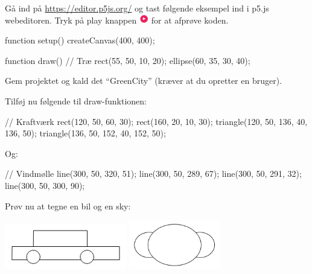 \documentclass{ucph-handout}
\newcounter{handout}
\newcommand{\Ark}{Ark \#\arabic{handout} -- }
\begin{document}
\renewcommand{\Title}{\Ark Tegn med Processing.py}%
\begin{exercisebox}[adjusted title=Første program]
Gå ind på \url{https://editor.p5js.org/} og tast følgende eksempel ind
i p5.js webeditoren. Tryk på play knappen
\includegraphics[height=4mm]{../illustrations/images/play_p5js} for at afprøve
koden.

\begin{javascript} 
function setup() {
  createCanvas(400, 400);
}

function draw() {
  // Træ
  rect(55, 50, 10, 20);
  ellipse(60, 35, 30, 40);
}
\end{javascript}

\vspace{3mm}
\noindent
Gem projektet og kald det ``GreenCity'' (kræver at du opretter en bruger).

\vspace{3mm}
\noindent
Tilføj nu følgende til draw-funktionen:
\begin{javascript}
// Kraftværk
rect(120, 50, 60, 30);
rect(160, 20, 10, 30);
triangle(120, 50, 136, 40, 136, 50);
triangle(136, 50, 152, 40, 152, 50);
\end{javascript}
Og:
\begin{javascript}
// Vindmølle
line(300, 50, 320, 51);
line(300, 50, 289, 67);
line(300, 50, 291, 32);
line(300, 50, 300, 90);
\end{javascript}

Prøv nu at tegne en bil og en sky:

\includegraphics[width=0.4\textwidth]{../illustrations/images/bil-streg.png}
\includegraphics[width=0.3\textwidth]{../illustrations/images/sky.png}
\end{exercisebox}
\end{document}
